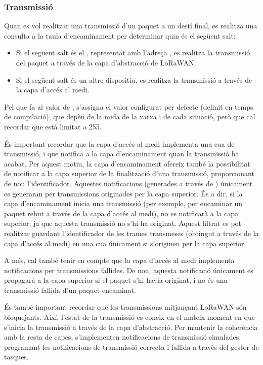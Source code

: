\documentclass{tfgitic}[2024/07/01]
\begin{document}
{\subsubsection{Transmissió}
\label{subsubsec:routing_tx}
Quan es vol realitzar una transmissió d'un paquet a un destí final, es realitza una consulta a la taula d'encaminament per determinar quin és el següent salt:
\begin{itemize}
    \item Si el següent salt és el , representat amb l'adreça , es realitza la transmissió del paquet a través de la capa d'abstracció de LoRaWAN.
    \item Si el següent salt és un altre dispositiu, es realitza la transmissió a través de la capa d'accés al medi.
\end{itemize}

Pel que fa al valor de , s'assigna el valor configurat per defecte (definit en temps de compilació), que depèn de la mida de la xarxa i de cada situació, però que cal recordar que està limitat a 255.

És important recordar que la capa d'accés al medi implementa una cua de transmissió, i que notifica a la capa d'encaminament quan la transmissió ha acabat. Per aquest motiu, la capa d'encaminament ofereix també la possibilitat de notificar a la capa superior de la finalització d'una transmissió, proporcionant de nou l'identificador. Aquestes notificacions (generades a través de ) únicament es generaran per transmissions originades per la capa superior. És a dir, si la capa d'encaminament inicia una transmissió (per exemple, per encaminar un paquet rebut a través de la capa d'accés al medi), no es notificarà a la capa superior, ja que aquesta transmissió no s'hi ha originat. Aquest filtrat es pot realitzar guardant l'identificador de les trames transmeses (obtingut a través de la capa d'accés al medi) en una cua únicament si s'originen per la capa superior.

A més, cal també tenir en compte que la capa d'accés al medi implementa notificacions per transmissions fallides. De nou, aquesta notificació únicament es propagarà a la capa superior si el paquet s'hi havia originat, i no és una transmissió fallida d'un paquet encaminat. 

És també important recordar que les transmissions mitjançant LoRaWAN són bloquejants. Així, l'estat de la transmissió es coneix en el mateix moment en que s'inicia la transmissió a través de la capa d'abstracció. Per mantenir la coherència amb la resta de capes, s'implementen notificacions de transmissió simulades, programant les notificacions de transmissió correcta i fallida a través del gestor de tasques.
}
\end{document}
